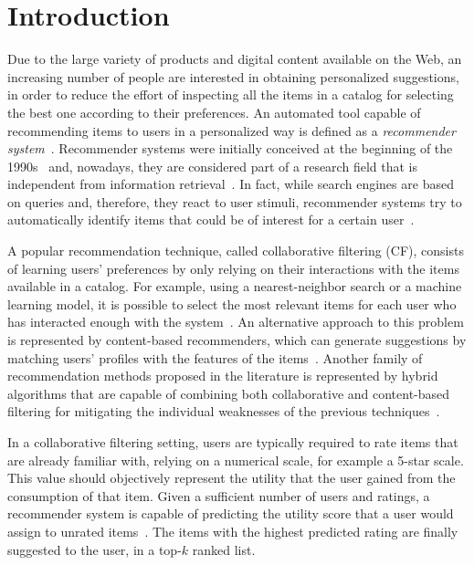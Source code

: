 \chapter{Introduction}
\graphicspath{{Chapter01/Figures/}}

Due to the large variety of products and digital content available on the Web, an increasing number of people are interested in obtaining personalized suggestions, in order to reduce the effort of inspecting all the items in a catalog for selecting the best one according to their preferences. An automated tool capable of recommending items to users in a personalized way is defined as a \textit{recommender system}~\cite{Ricci2015}. Recommender systems were initially conceived at the beginning of the 1990s~\cite{Goldberg1992} and, nowadays, they are considered part of a research field that is independent from information retrieval~\cite{Herlocker2000}. In fact, while search engines are based on queries and, therefore, they react to user stimuli, recommender systems try to automatically identify items that could be of interest for a certain user~\cite{Balabanovic1997}.

A popular recommendation technique, called collaborative filtering (CF), consists of learning users' preferences by only relying on their interactions with the items available in a catalog. For example, using a nearest-neighbor search or a machine learning model, it is possible to select the most relevant items for each user who has interacted enough with the system~\cite{Su2009}. An alternative approach to this problem is represented by content-based recommenders, which can generate suggestions by matching users' profiles with the features of the items~\cite{Balabanovic1997,Basu1998}. Another family of recommendation methods proposed in the literature is represented by hybrid algorithms that are capable of combining both collaborative and content-based filtering for mitigating the individual weaknesses of the previous techniques~\cite{Stai2016}.

In a collaborative filtering setting, users are typically required to rate items that are already familiar with, relying on a numerical scale, for example a 5-star scale. This value should objectively represent the utility that the user gained from the consumption of that item. Given a sufficient number of users and ratings, a recommender system is capable of predicting the utility score that a user would assign to unrated items~\cite{Adomavicius2005}. The items with the highest predicted rating are finally suggested to the user, in a top-$k$ ranked list.

